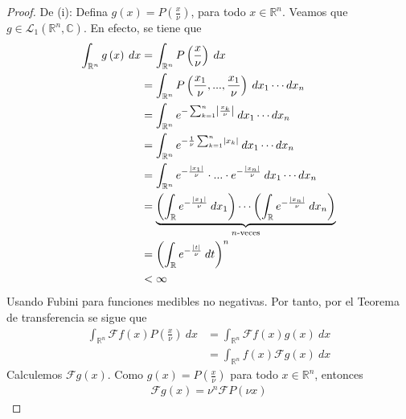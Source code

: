 \documentclass[12pt]{report}
\newcounter{it}
\theoremstyle{largebreak}
\newcommand\abs[1]{\ensuremath{\left|#1\right|}}
\newcommand{\fou}[1]{\ensuremath{\mathcal{F}#1}}
\begin{document}
    \begin{proof}
        De (i): Defina $g(x)=P\left(\frac{x}{\nu}\right)$, para todo $x\in\mathbb{R}^n$. Veamos que $g\in\mathcal{L}_1(\mathbb{R}^n,\mathbb{C})$. En efecto, se tiene que
        \begin{equation*}
            \begin{split}
                \int_{\mathbb{R}^n}g\left(x\right)\:dx&=\int_{\mathbb{R}^n}P\left(\frac{x}{\nu}\right)\:dx\\
                &=\int_{\mathbb{R}^n}P\left(\frac{x_1}{\nu},...,\frac{x_1}{\nu}\right)\:dx_1\cdots dx_n \\
                &=\int_{\mathbb{R}^n}e^{ -\sum_{ k=1}^n\abs{\frac{x_k}{\nu}}}\:dx_1\cdots dx_n\\
                &=\int_{\mathbb{R}^n}e^{ -\frac{1}{\nu}\sum_{ k=1}^n\abs{x_k}}\:dx_1\cdots dx_n\\
                &=\int_{\mathbb{R}^n}e^{-\frac{\abs{x_1}}{\nu}}\cdot...\cdot e^{-\frac{\abs{x_n}}{\nu}}\:dx_1\cdots dx_n\\
                &=\underbrace{\left(\int_{\mathbb{R}}e^{-\frac{\abs{x_1}}{\nu}}\:dx_1\right)\cdots\left(\int_{\mathbb{R}}e^{-\frac{\abs{x_n}}{\nu}}\:dx_n\right)}_{ n\textup{-veces}}\\
                &=\left(\int_{\mathbb{R}}e^{-\frac{\abs{t}}{\nu}}\:dt\right)^n\\
                &<\infty
            \end{split}
        \end{equation*}
        Usando Fubini para funciones medibles no negativas. Por tanto, por el Teorema de transferencia se sigue que
        \begin{equation*}
            \begin{split}
                \int_{\mathbb{R}^n}\fou{f}(x)P\left(\frac{x}{\nu}\right)\:dx&=\int_{\mathbb{R}^n}\fou{f}(x)g(x)\:dx\\
                &=\int_{\mathbb{R}^n}f(x)\fou{g}(x)\:dx
            \end{split}
        \end{equation*}
        Calculemos $\fou{g}(x)$. Como $g(x)=P\left(\frac{x}{\nu}\right)$ para todo $x\in\mathbb{R}^n$, entonces
        \begin{equation*}
            \begin{split}
                \fou{g}(x)=\nu^n\fou{P}(\nu x)
            \end{split}
        \end{equation*}

\end{proof}
\end{document}
